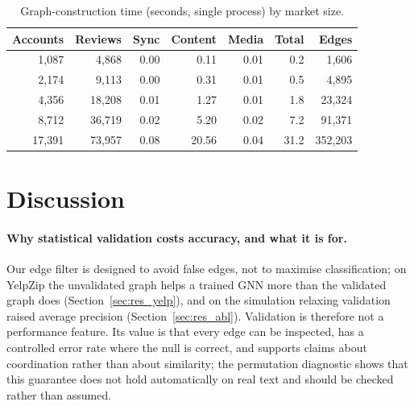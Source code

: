 \documentclass[pdflatex,sn-basic]{sn-jnl}
\theoremstyle{thmstyleone}
\theoremstyle{thmstylethree}
\begin{document}
\begin{table}[t]
\caption{Graph-construction time (seconds, single process) by market size.}\label{tab:scale}
\small\setlength{\tabcolsep}{3pt}
\begin{tabular}{@{}rrrrrrr@{}}
\toprule
Accounts & Reviews & Sync & Content & Media & Total & Edges \\
\midrule
1,087 & 4,868 & 0.00 & 0.11 & 0.01 & 0.2 & 1,606 \\
2,174 & 9,113 & 0.00 & 0.31 & 0.01 & 0.5 & 4,895 \\
4,356 & 18,208 & 0.01 & 1.27 & 0.01 & 1.8 & 23,324 \\
8,712 & 36,719 & 0.02 & 5.20 & 0.02 & 7.2 & 91,371 \\
17,391 & 73,957 & 0.08 & 20.56 & 0.04 & 31.2 & 352,203 \\
\bottomrule
\end{tabular}
\end{table}
\section{Discussion}\label{sec:disc}

\paragraph{Why statistical validation costs accuracy, and what it is for.} Our edge filter is designed to avoid false edges, not to maximise classification; on YelpZip the unvalidated graph helps a trained GNN more than the validated graph does (Section~\ref{sec:res_yelp}), and on the simulation relaxing validation raised average precision (Section~\ref{sec:res_abl}). Validation is therefore not a performance feature. Its value is that every edge can be inspected, has a controlled error rate where the null is correct, and supports claims about coordination rather than about similarity; the permutation diagnostic shows that this guarantee does not hold automatically on real text and should be checked rather than assumed.
\end{document}
